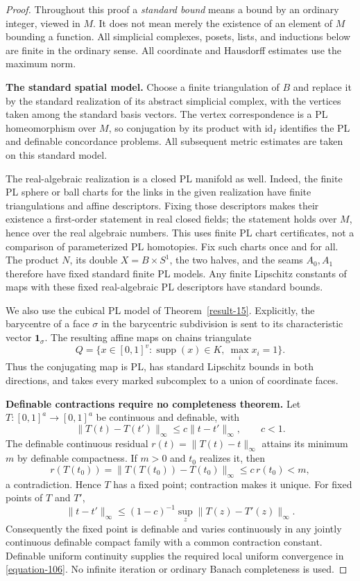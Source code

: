 \documentclass[11pt,a4paper]{article}
\theoremstyle{definition}
\begin{document}
\begin{proof}
Throughout this proof a \emph{standard bound} means a bound by
an ordinary integer, viewed in $M$. It does not mean merely
the existence of an element of $M$ bounding a function.
All simplicial complexes, posets, lists, and inductions below
are finite in the ordinary sense.
All coordinate and Hausdorff estimates use the maximum norm.

\textbf{The standard spatial model.}\quad
Choose a finite triangulation of $B$ and replace it by the
standard realization of its abstract simplicial complex,
with the vertices taken among the standard basis vectors.
The vertex correspondence is a PL homeomorphism over $M$,
so conjugation by its product with $\mathrm{id}_I$ identifies
the PL and definable concordance problems. All subsequent
metric estimates are taken on this standard model.

The real-algebraic realization is a closed PL manifold as well.
Indeed, the finite PL sphere or ball charts for the links in
the given realization have finite triangulations and affine
descriptors. Fixing those descriptors makes their existence
a first-order statement in real closed fields; the statement
holds over $M$, hence over the real algebraic numbers. This
uses finite PL chart certificates, not a comparison of
parameterized PL homotopies. Fix such charts once and for all.
The product $N$, its double $X=B\times S^1$, the two halves,
and the seams $A_0,A_1$ therefore have fixed standard finite
PL models. Any finite Lipschitz constants of maps with these
fixed real-algebraic PL descriptors have standard bounds.

We also use the cubical PL model of Theorem~\ref{result-15}. Explicitly, the
barycentre of a face $\sigma$ in the barycentric subdivision
is sent to its characteristic vector $\mathbf1_\sigma$.
The resulting affine maps on chains triangulate
\[
 Q=\{x\in[0,1]^v:
          \operatorname{supp}(x)\in K,\ \max_i x_i=1\}.
\]
Thus the conjugating map is PL, has standard Lipschitz bounds
in both directions, and takes every marked subcomplex to a
union of coordinate faces.

\textbf{Definable contractions require no completeness theorem.}\quad
Let $T:[0,1]^a\to[0,1]^a$ be continuous and definable, with
\[
 \|T(t)-T(t')\|_\infty\le c\|t-t'\|_\infty,\qquad c<1.
\]
The definable continuous residual
$r(t)=\|T(t)-t\|_\infty$ attains its minimum $m$ by definable
compactness. If $m>0$ and $t_0$ realizes it, then
\[
 r(T(t_0))
 =\|T(T(t_0))-T(t_0)\|_\infty
 \le c\,r(t_0)<m,
\]
a contradiction. Hence $T$ has a fixed point; contraction
makes it unique. For fixed points of $T$ and $T'$,
\begin{equation}
 \|t-t'\|_\infty
 \le (1-c)^{-1}\sup_z\|T(z)-T'(z)\|_\infty.
 \label{equation-106}
\end{equation}
Consequently the fixed point is definable and varies
continuously in any jointly continuous definable compact
family with a common contraction constant. Definable uniform
continuity supplies the required local uniform convergence
in \eqref{equation-106}. No infinite iteration or ordinary Banach
completeness is used.


\end{proof}
\end{document}

